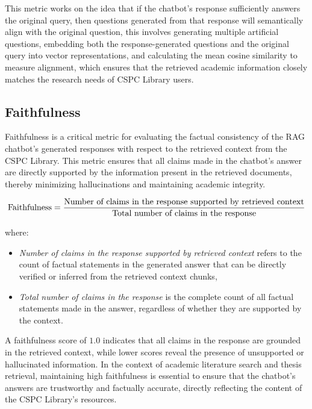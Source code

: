 \begin{refsection}
This metric works on the idea that if the chatbot's response sufficiently answers the original query, then questions generated from that response will semantically align with the original question, this involves generating multiple artificial questions, embedding both the response-generated questions and the original query into vector representations, and calculating the mean cosine similarity to measure alignment, which ensures that the retrieved academic information closely matches the research needs of CSPC Library users.

\subsection*{Faithfulness}

Faithfulness is a critical metric for evaluating the factual consistency of the RAG chatbot's generated responses with respect to the retrieved context from the CSPC Library. This metric ensures that all claims made in the chatbot's answer are directly supported by the information present in the retrieved documents, thereby minimizing hallucinations and maintaining academic integrity.

\begin{equation}
\centering
\text{Faithfulness} = \frac{\text{Number of claims in the response supported by retrieved context}}{\text{Total number of claims in the response}}
\end{equation}

where:
\begin{itemize}
\item \textit{Number of claims in the response supported by retrieved context} refers to the count of factual statements in the generated answer that can be directly verified or inferred from the retrieved context chunks,
\item \textit{Total number of claims in the response} is the complete count of all factual statements made in the answer, regardless of whether they are supported by the context.
\end{itemize}

A faithfulness score of $1.0$ indicates that all claims in the response are grounded in the retrieved context, while lower scores reveal the presence of unsupported or hallucinated information. In the context of academic literature search and thesis retrieval, maintaining high faithfulness is essential to ensure that the chatbot's answers are trustworthy and factually accurate, directly reflecting the content of the CSPC Library's resources.



\end{refsection}
